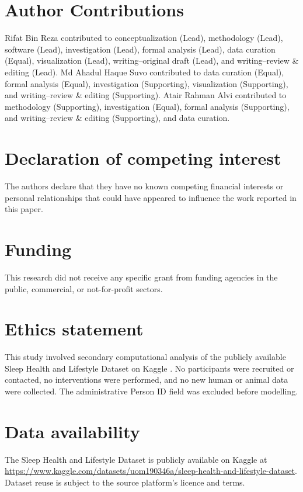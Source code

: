 \documentclass[a4paper,fleqn]{cas-dc}
\begin{document}
\section*{Author Contributions}

Rifat Bin Reza contributed to conceptualization (Lead), methodology (Lead),
software (Lead), investigation (Lead), formal analysis (Lead), data curation
(Equal), visualization (Lead), writing--original draft (Lead), and
writing--review \& editing (Lead). Md Ahadul Haque Suvo contributed to data
curation (Equal), formal analysis (Equal), investigation (Supporting),
visualization (Supporting), and writing--review \& editing (Supporting).
Atair Rahman Alvi contributed to methodology (Supporting), investigation
(Equal), formal analysis (Supporting), and writing--review \& editing (Supporting), and data curation.

\section*{Declaration of competing interest}

The authors declare that they have no known competing financial interests or personal relationships that could have appeared to influence the work reported in this paper.

\section*{Funding}

This research did not receive any specific grant from funding agencies in the public, commercial, or not-for-profit sectors.

\section*{Ethics statement}

This study involved secondary computational analysis of the publicly available Sleep Health and Lifestyle Dataset on Kaggle \cite{kaggle2023}. No participants were recruited or contacted, no interventions were performed, and no new human or animal data were collected. The administrative Person ID field was excluded before modelling.

\section*{Data availability}

The Sleep Health and Lifestyle Dataset is publicly available on Kaggle at \url{https://www.kaggle.com/datasets/uom190346a/sleep-health-and-lifestyle-dataset}. Dataset reuse is subject to the source platform's licence and terms.
\end{document}
